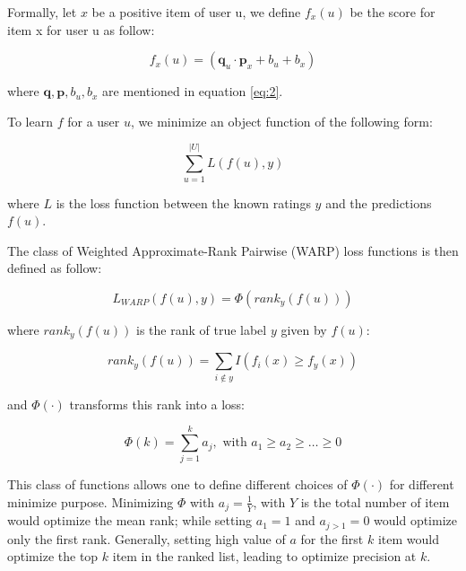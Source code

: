 \noindent Formally, let \(x\) be a positive item of user u, we define \( f_x(u) \) be the score for item x for user u as follow:

\begin{displaymath}
f_x(u) =  (\boldsymbol{q}_u \cdot \boldsymbol{p}_x + b_u + b_x) 
\end{displaymath}

\noindent where \(\boldsymbol{q}, \boldsymbol{p}, b_u, b_x\) are mentioned in equation \eqref{eq:2}. \hfill \break
 
\noindent To learn \(f\) for a user \(u\), we minimize an object function of the following form:

\begin{displaymath}
\sum_{u=1}^{\lvert U \rvert} L\left(f(u), y\right) \tag{3} \label{eq:3}
\end{displaymath}

\noindent where \(L\) is the loss function between the known ratings \(y\) and the predictions \(f(u)\).  \hfill \break

\noindent The class of Weighted Approximate-Rank Pairwise (WARP) loss functions is then defined as follow:

\begin{displaymath}
L_{WARP}(f(u), y) =  \Phi \left(rank_y(f(u))\right)   \tag{4} \label{eq:4}
\end{displaymath}

\noindent where \(rank_y(f(u))\) is the rank of true label \(y\) given by \(f(u)\):

\begin{displaymath}
rank_y(f(u)) = \sum_{i \notin y} I \left(f_i(x) \geq f_y(x)\right)   \tag{5} \label{eq:5}
\end{displaymath}

\noindent and \( \Phi (\cdot) \) transforms this rank into a loss:

\begin{displaymath}
\Phi(k) = \sum_{j=1}^k a_j, \text{ with } a_1 \geq a_2 \geq \ldots \geq 0   
\end{displaymath}

\noindent This class of functions allows one to define different choices of \( \Phi(\cdot) \)  for different minimize purpose. Minimizing \( \Phi\) with \(a_j = \frac{1}{Y} \), with \(Y\) is the total number of item would optimize the mean rank; while setting \(a_1 = 1\) and \( a_{j>1} = 0 \) would optimize only the first rank. Generally,  setting high value of \(a\) for the first \(k\) item would optimize the top \(k\) item in the ranked list, leading to optimize precision at \(k\). 

